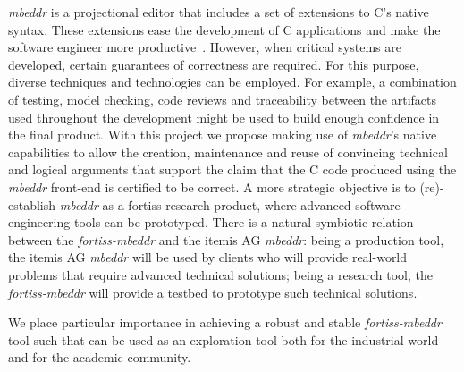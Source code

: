 \emph{mbeddr} is a projectional editor that includes a set of extensions to C's
native syntax. These extensions ease the development of C applications and make
the software engineer more productive~\cite{VoelterRKS13}.
However, when critical systems are developed, certain guarantees of correctness
are required. For this purpose, diverse techniques and technologies
can be employed. For example, a combination of testing, model checking, code
reviews and traceability between the artifacts used throughout the development
might be used to build enough confidence in the final product.
With this project we propose making use of \emph{mbeddr}'s native capabilities
to allow the creation, maintenance and reuse of convincing technical and logical
arguments that support the claim that the C code produced using the
\emph{mbeddr} front-end is certified to be correct. A more strategic objective
is to (re)-establish \emph{mbeddr} as a fortiss research product, where advanced
software engineering tools can be prototyped. There is a natural symbiotic
relation between the \emph{fortiss-mbeddr} and the itemis AG \emph{mbeddr}:
being a production tool, the itemis AG \emph{mbeddr} will be used by
clients who will provide real-world problems that require advanced technical
solutions; being a research tool, the \emph{fortiss-mbeddr} will provide a
testbed to prototype such technical solutions.

We place particular importance in achieving a robust and stable
\emph{fortiss-mbeddr} tool such that can be used as an exploration tool both for
the industrial world and for the academic community.